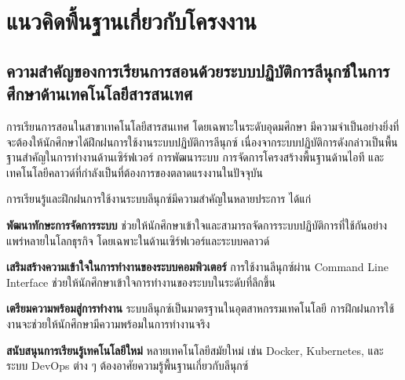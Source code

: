 
\section{แนวคิดพื้นฐานเกี่ยวกับโครงงาน}

\subsection{ความสำคัญของการเรียนการสอนด้วยระบบปฏิบัติการลีนุกซ์ในการศึกษาด้านเทคโนโลยีสารสนเทศ}

\hspace*{1.3em} %
การเรียนการสอนในสาขาเทคโนโลยีสารสนเทศ โดยเฉพาะในระดับอุดมศึกษา มีความจำเป็นอย่างยิ่งที่จะต้องให้นักศึกษาได้ฝึกฝนการใช้งานระบบปฏิบัติการลีนุกซ์ เนื่องจากระบบปฏิบัติการดังกล่าวเป็นพื้นฐานสำคัญในการทำงานด้านเซิร์ฟเวอร์ การพัฒนาระบบ การจัดการโครงสร้างพื้นฐานด้านไอที และเทคโนโลยีคลาวด์ที่กำลังเป็นที่ต้องการของตลาดแรงงานในปัจจุบัน \parencite{anderson2008theory}

\hspace*{1.3em} %
การเรียนรู้และฝึกฝนการใช้งานระบบลีนุกซ์มีความสำคัญในหลายประการ ได้แก่
\begin{mycustomitem}
    \item \textbf{พัฒนาทักษะการจัดการระบบ} ช่วยให้นักศึกษาเข้าใจและสามารถจัดการระบบปฏิบัติการที่ใช้กันอย่างแพร่หลายในโลกธุรกิจ โดยเฉพาะในด้านเซิร์ฟเวอร์และระบบคลาวด์
    \item \textbf{เสริมสร้างความเข้าใจในการทำงานของระบบคอมพิวเตอร์} การใช้งานลีนุกซ์ผ่าน Command Line Interface ช่วยให้นักศึกษาเข้าใจการทำงานของระบบในระดับที่ลึกขึ้น
    \item \textbf{เตรียมความพร้อมสู่การทำงาน} ระบบลีนุกซ์เป็นมาตรฐานในอุตสาหกรรมเทคโนโลยี การฝึกฝนการใช้งานจะช่วยให้นักศึกษามีความพร้อมในการทำงานจริง
    \item \textbf{สนับสนุนการเรียนรู้เทคโนโลยีใหม่} หลายเทคโนโลยีสมัยใหม่ เช่น Docker, Kubernetes, และระบบ DevOps ต่าง ๆ ต้องอาศัยความรู้พื้นฐานเกี่ยวกับลีนุกซ์ \parencite{lee2021container}
\end{mycustomitem}

